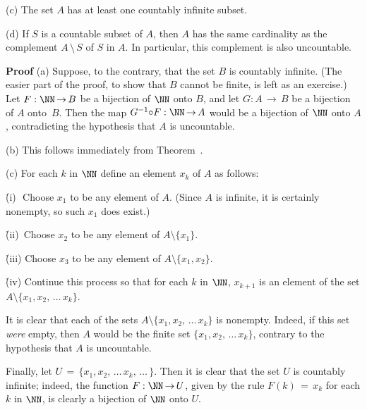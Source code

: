 {        (c) The set $A$ has at least one countably infinite subset.

\V

        (d) If $S$ is a countable subset of $A$, then $A$ has the same cardinality as the complement $A\,{\setminus}\,S$ of $S$ in $A$.
    In particular, this complement is also uncountable.

\V

        {\bf Proof} (a) Suppose, to the contrary, that the set $B$ is countably infinite.
    (The easier part of the proof, to show that $B$ cannot be finite, is left as an exercise.)
    Let $F:{\NN} \,{\rightarrow}\, B$ be a bijection of ${\NN}$ onto $B$, and let $G:A \,{\rightarrow}\, B$ be a bijection of $A$ onto~$B$.
    Then the map $G^{-1}{\circ}F:{\NN} \,{\rightarrow}\, A$ would be a bijection of ${\NN}$ onto $A$, contradicting the hypothesis that $A$ is uncountable.

\V

        (b) This follows immediately from Theorem~.

\V

        (c) For each $k$ in ${\NN}$ define an element $x_{k}$ of $A$ as follows:

        \h (i)\,\, Choose $x_{1}$ to be any element of $A$. (Since $A$ is infinite, it is certainly nonempty, so such $x_{1}$ does exist.)

        \h (ii)\, Choose $x_{2}$ to be any element of $A{\setminus}\{x_{1}\}$.

        \h (iii) Choose $x_{3}$ to be any element of $A{\setminus}\{x_{1},x_{2}\}$.

        \h (iv) Continue this process so that for each $k$ in ${\NN}$, $x_{k+1}$ is an element of the set $A{\setminus}\{x_{1},x_{2},\,{\ldots}\,x_{k}\}$.

\noindent It is clear that each of the sets $A{\setminus}\{x_{1},x_{2},\,{\ldots}\,x_{k}\}$ is nonempty.
    Indeed, if this set {\em were} empty, then $A$ would  be the finite set $\{x_{1},x_{2},\,{\ldots}\,x_{k}\}$,
    contrary to the hypothesis that $A$ is uncountable.

        Finally, let $U \,=\, \{x_{1},x_{2},\,{\ldots}\,x_{k},\,{\ldots}\,\}$. Then it is clear that the set $U$ is countably infinite; indeed, the function $F:{\NN} \,{\rightarrow}\, U$,
    given by the rule $F(k) \,=\, x_{k}$ for each $k$ in ${\NN}$, is clearly a bijection of ${\NN}$ onto $U$.

\V

}
